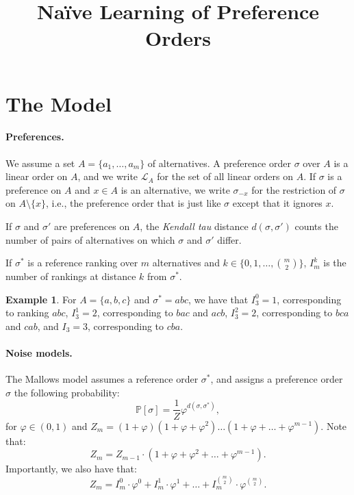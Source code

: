 \documentclass{article}
\title{Na\"ive Learning of Preference Orders}
\author{}
\theoremstyle{definition}
\newtheorem{example}{Example}
\renewcommand{\phi}{\varphi}
\newcommand{\PR}{\mathbb{P}}
\begin{document}
    \maketitle

    \section{The Model}\label{sec:model}
    
    \paragraph{Preferences.} We assume a set \(A = \{a_1,\dots,a_m\}\) of alternatives.
    A preference order \(\sigma\) over \(A\) is a linear order on \(A\),
    and we write \(\mathcal{L}_A\) for the set of all linear orders on \(A\).
    If \(\sigma\) is a preference on \(A\) and \(x\in A\) is an alternative, 
    we write \(\sigma_{-x}\) for the restriction of \(\sigma\) on \(A\setminus\{x\}\), 
    i.e., the preference order that is just like \(\sigma\) except that it ignores \(x\).
    
    If \(\sigma\) and \(\sigma'\) are preferences on \(A\), the \emph{Kendall tau} distance \(d(\sigma,\sigma')\)
    counts the number of pairs of alternatives on which \(\sigma\) and \(\sigma'\) differ.

    If \(\sigma^*\) is a reference ranking over \(m\) alternatives
    and \(k\in\{0,1,\dots,{m\choose 2}\}\), 
    \(I_m^k\) is the number of rankings at distance \(k\) from \(\sigma^*\).

    \begin{example}\label{ex:basic-notions}
        For \(A = \{a,b,c\}\) and \(\sigma^* = abc\), we have that 
        \(I_3^0 = 1\), corresponding to ranking \(abc\),
        \(I_3^1 = 2\), corresponding to \(bac\) and \(acb\),
        \(I_3^2 = 2\), corresponding to \(bca\) and \(cab\),
        and \(I_3 = 3\), corresponding to \(cba\).
    \end{example}

    \paragraph{Noise models.}
    The Mallows model assumes a reference order \(\sigma^*\), and assigns a preference order \(\sigma\)
    the following probability:
    \[
      \PR[\sigma] = \frac{1}{Z}\phi^{d(\sigma,\sigma^*)},
    \]
    for \(\phi\in(0,1)\) and \(Z_m = (1+\phi)(1+\phi+\phi^2)\dots(1+\phi+\dots+\phi^{m-1})\).
    Note that:
    \[
      Z_m = Z_{m-1}\cdot(1+\phi+\phi^2+\dots+\phi^{m-1})  .
    \]
    Importantly, we also have that:
    \[
      Z_m = I_m^0\cdot \phi^0 + I_m^1\cdot\phi^1 + \dots + I_m^{m\choose 2}\cdot\phi^{m\choose 2}.
    \]
\end{document}
